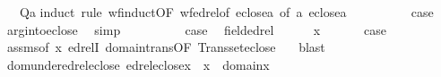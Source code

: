 \begin{isabellebody}
\ \ \ {\isachardoublequoteopen}Q{\isacharparenleft}{\kern0pt}a{\isacharparenright}{\kern0pt}{\isachardoublequoteclose}\isanewline
%
\isadelimproof
%
\endisadelimproof
%
\isatagproof
{}\isamarkupfalse%
{\isacharparenleft}{\kern0pt}induct\ rule{\isacharcolon}{\kern0pt}\ wf{\isacharunderscore}{\kern0pt}induct{}{\isacharbrackleft}{\kern0pt}OF\ wf{\isacharunderscore}{\kern0pt}edrel{\isacharbrackleft}{\kern0pt}of\ {\isachardoublequoteopen}eclose{\isacharparenleft}{\kern0pt}{\isacharbraceleft}{\kern0pt}a{\isacharbraceright}{\kern0pt}{\isacharparenright}{\kern0pt}{\isachardoublequoteclose}{\isacharbrackright}{\kern0pt}\ {\isacharcomma}{\kern0pt}of\ a\ {\isachardoublequoteopen}eclose{\isacharparenleft}{\kern0pt}{\isacharbraceleft}{\kern0pt}a{\isacharbraceright}{\kern0pt}{\isacharparenright}{\kern0pt}{\isachardoublequoteclose}{\isacharbrackright}{\kern0pt}{\isacharparenright}{\kern0pt}\isanewline
\ \ \isamarkupfalse%
\ {}\isanewline
\ \ \isamarkupfalse%
\ \isamarkupfalse%
\ {\isacharquery}{\kern0pt}case\ \isamarkupfalse%
\ arg{\isacharunderscore}{\kern0pt}into{\isacharunderscore}{\kern0pt}eclose\ \isamarkupfalse%
\ simp\isanewline
{}\isamarkupfalse%
\isanewline
\ \ \isamarkupfalse%
\ {}\isanewline
\ \ \isamarkupfalse%
\ \isamarkupfalse%
\ {\isacharquery}{\kern0pt}case\ \isamarkupfalse%
\ field{\isacharunderscore}{\kern0pt}edrel\ \isacommand{{\isachardot}{\kern0pt}}\isamarkupfalse%
\isanewline
{}\isamarkupfalse%
\isanewline
\ \ \isamarkupfalse%
\ {\isacharparenleft}{\kern0pt}{}\ x{\isacharparenright}{\kern0pt}\isanewline
\ \ \isamarkupfalse%
\isanewline
\ \ \isamarkupfalse%
\ {\isacharquery}{\kern0pt}case\isanewline
\ \ \ \ \isamarkupfalse%
\ assms{\isacharbrackleft}{\kern0pt}of\ x{\isacharbrackright}{\kern0pt}\ edrelI\ domain{\isacharunderscore}{\kern0pt}trans{\isacharbrackleft}{\kern0pt}OF\ Transset{\isacharunderscore}{\kern0pt}eclose\ {}{\isacharparenleft}{\kern0pt}{}{\isacharparenright}{\kern0pt}{\isacharbrackright}{\kern0pt}\ \isamarkupfalse%
\ blast\isanewline
{}\isamarkupfalse%
%
\endisatagproof
{\isafoldproof}%
%
\isadelimproof
\isanewline
%
\endisadelimproof
\isanewline
{}\isamarkupfalse%
\ dom{\isacharunderscore}{\kern0pt}under{\isacharunderscore}{\kern0pt}edrel{\isacharunderscore}{\kern0pt}eclose{\isacharcolon}{\kern0pt}\ {\isachardoublequoteopen}edrel{\isacharparenleft}{\kern0pt}eclose{\isacharparenleft}{\kern0pt}{\isacharbraceleft}{\kern0pt}x{\isacharbraceright}{\kern0pt}{\isacharparenright}{\kern0pt}{\isacharparenright}{\kern0pt}\ {\isacharminus}{\kern0pt}{\isacharbackquote}{\kern0pt}{\isacharbackquote}{\kern0pt}\ {\isacharbraceleft}{\kern0pt}x{\isacharbraceright}{\kern0pt}\ {\isacharequal}{\kern0pt}\ domain{\isacharparenleft}{\kern0pt}x{\isacharparenright}{\kern0pt}{\isachardoublequoteclose}\isanewline

\end{isabellebody}
